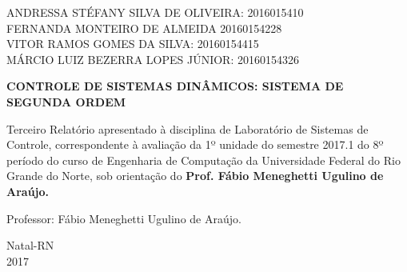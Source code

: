\documentclass[a4paper,12pt]{article}
\begin{document}
\newpage


\thispagestyle{empty}

\begin{center}
\begin{normalsize}
ANDRESSA STÉFANY SILVA DE OLIVEIRA: 2016015410\\
\vspace{0.8cm}
FERNANDA MONTEIRO DE ALMEIDA 20160154228\\
\vspace{0.8cm}
VITOR RAMOS GOMES DA SILVA: 20160154415\\
\vspace{0.8cm}
MÁRCIO LUIZ BEZERRA LOPES JÚNIOR: 20160154326\\

\end{normalsize}
\end{center}
\vspace{3cm}

{\bf{\large {\centering CONTROLE DE SISTEMAS DINÂMICOS: SISTEMA DE SEGUNDA ORDEM\\}}}

\vspace{4cm}

\begin{adjustwidth}{7.5cm}{0cm}

{\normalsize

Terceiro Relatório apresentado à disciplina de
Laboratório de Sistemas de Controle, correspondente à
avaliação da 1º unidade do semestre 2017.1 do 8º período
do curso de Engenharia de Computação da
Universidade Federal do Rio Grande do Norte, sob
orientação do {\bf Prof. Fábio Meneghetti Ugulino de
Araújo.}

}

\end{adjustwidth}

\vspace{2cm}

\begin{center}

Professor:  Fábio Meneghetti Ugulino de Araújo.

\vspace{2.5cm}

{\large Natal-RN\\
2017}

\end{center}

\newpage
\end{document}
